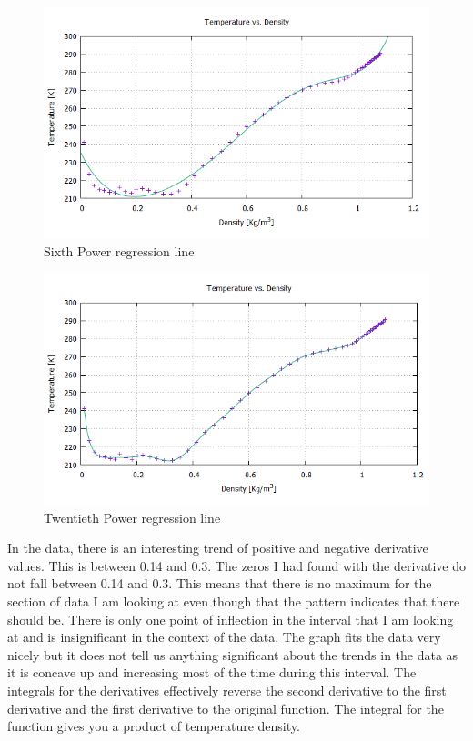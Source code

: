 \documentclass{article}
\begin{document}
\begin{figure}[p]
\centering
\includegraphics[scale=0.5]{nate-data/six}
\caption{Sixth Power regression line}
\label{nate1}
\end{figure}

\begin{figure}[p]
\centering
\includegraphics[scale=0.5]{nate-data/twenty}
\caption{Twentieth Power regression line}
\label{nate2}
\end{figure}

In the data, there is an interesting trend of positive and negative derivative values. This is between 0.14 and 0.3. The zeros I had found with the derivative do not fall between 0.14 and 0.3. This means that there is no maximum for the section of data I am looking at even though that the pattern indicates that there should be. There is only one point of inflection in the interval that I am looking at and is insignificant in the context of the data.
The graph fits the data very nicely but it does not tell us anything significant about the trends in the data as it is concave up and increasing most of the time during this interval.
The integrals for the derivatives effectively reverse the second derivative to the first derivative and the first derivative to the original function. The integral for the function gives you a product of temperature density.
\end{document}
